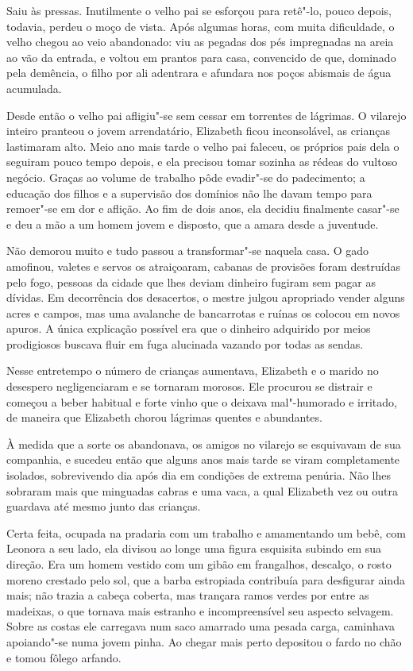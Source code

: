  Saiu às pressas. Inutilmente o velho pai se esforçou para retê"-lo,
pouco depois, todavia, perdeu o moço de vista. Após algumas horas, com
muita dificuldade, o velho chegou ao veio abandonado: viu as pegadas
dos pés impregnadas na areia ao vão da entrada, e voltou em prantos
para casa, convencido de que, dominado pela demência, o filho por ali
adentrara e afundara nos poços abismais de água acumulada.

Desde então o velho pai afligiu"-se sem cessar em torrentes de lágrimas.
O vilarejo inteiro pranteou o jovem arrendatário, Elizabeth ficou
inconsolável, as crianças lastimaram alto. Meio ano mais tarde o velho
pai faleceu, os próprios pais dela o seguiram pouco tempo depois, e ela
precisou tomar sozinha as rédeas do vultoso negócio. Graças ao volume
de trabalho pôde evadir"-se do padecimento; a educação dos filhos e a
supervisão dos domínios não lhe davam tempo para remoer"-se em dor e
aflição. Ao fim de dois anos, ela decidiu finalmente casar"-se e deu a
mão a um homem jovem e disposto, que a amara desde a juventude.

Não demorou muito e tudo passou a transformar"-se naquela casa. O gado
amofinou, valetes e servos os atraiçoaram, cabanas de provisões foram
destruídas pelo fogo, pessoas da cidade que lhes deviam dinheiro
fugiram sem pagar as dívidas. Em decorrência dos desacertos, o mestre
julgou apropriado vender alguns acres e campos, mas uma avalanche de
bancarrotas e ruínas os colocou em novos apuros. A única explicação
possível era que o dinheiro adquirido por meios prodigiosos buscava
fluir em fuga alucinada vazando por todas as sendas.

Nesse entretempo o número de crianças aumentava, Elizabeth e o marido no
desespero negligenciaram e se tornaram morosos. Ele procurou se
distrair e começou a beber habitual e forte vinho que o deixava
mal"-humorado e irritado, de maneira que Elizabeth chorou lágrimas
quentes e abundantes.

À medida que a sorte os abandonava, os amigos no vilarejo se esquivavam
de sua companhia, e sucedeu então que alguns anos mais tarde se viram
completamente isolados, sobrevivendo dia após dia em condições de
extrema penúria. Não lhes sobraram mais que minguadas cabras e uma
vaca, a qual Elizabeth vez ou outra guardava até mesmo junto das
crianças.

Certa feita, ocupada na pradaria com um trabalho e amamentando
um bebê, com Leonora a seu lado, ela divisou ao longe uma figura
esquisita subindo em sua direção. Era um homem vestido com um gibão em
frangalhos, descalço, o rosto moreno crestado pelo sol, que a barba
estropiada contribuía para desfigurar ainda mais; não trazia a cabeça
coberta, mas trançara ramos verdes por entre as madeixas, o que tornava
mais estranho e incompreensível seu aspecto selvagem. Sobre as costas
ele carregava num saco amarrado uma pesada carga, caminhava apoiando"-se 
numa jovem pinha. Ao chegar mais perto depositou o fardo no chão e
tomou fôlego arfando.

